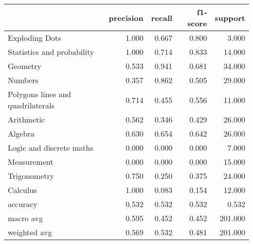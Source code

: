 \begin{tabular}{lrrrr}
\toprule
{} &  precision &  recall &  f1-score &  support \\
\midrule
Exploding Dots                    &      1.000 &   0.667 &     0.800 &    3.000 \\
Statistics and probability        &      1.000 &   0.714 &     0.833 &   14.000 \\
Geometry                          &      0.533 &   0.941 &     0.681 &   34.000 \\
Numbers                           &      0.357 &   0.862 &     0.505 &   29.000 \\
Polygons lines and quadrilaterals &      0.714 &   0.455 &     0.556 &   11.000 \\
Arithmetic                        &      0.562 &   0.346 &     0.429 &   26.000 \\
Algebra                           &      0.630 &   0.654 &     0.642 &   26.000 \\
Logic and discrete maths          &      0.000 &   0.000 &     0.000 &    7.000 \\
Measurement                       &      0.000 &   0.000 &     0.000 &   15.000 \\
Trigonometry                      &      0.750 &   0.250 &     0.375 &   24.000 \\
Calculus                          &      1.000 &   0.083 &     0.154 &   12.000 \\
accuracy                          &      0.532 &   0.532 &     0.532 &    0.532 \\
macro avg                         &      0.595 &   0.452 &     0.452 &  201.000 \\
weighted avg                      &      0.569 &   0.532 &     0.481 &  201.000 \\
\bottomrule
\end{tabular}
